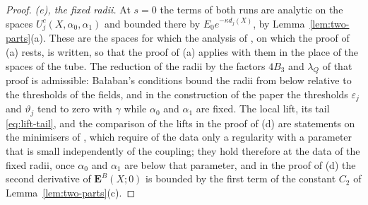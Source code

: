 \documentclass[11pt]{preprint}
\numberwithin{equation}{section}
\theoremstyle{definition}
\theoremstyle{remark}
\theoremstyle{plain}
\begin{document}
\begin{proof}
\emph{(e), the fixed radii.} At $s = 0$ the terms of both runs are analytic on the spaces $U^c_j(X, \alpha_0, \alpha_1)$ and bounded there by $E_0e^{-\kappa d_j(X)}$, by Lemma~\ref{lem:two-parts}(a). These are the spaces for which the analysis of \cite[Sects.~3--4]{BalabanRG1}, on which the proof of (a) rests, is written, so that the proof of (a) applies with them in the place of the spaces of the tube. The reduction of the radii by the factors $4B_3$ and $\lambda_Q$ of that proof is admissible: Ba{\l}aban's conditions bound the radii from below relative to the thresholds of the fields, and in the construction of the paper the thresholds $\varepsilon_j$ and $\vartheta_j$ tend to zero with $\gamma$ while $\alpha_0$ and $\alpha_1$ are fixed. The local lift, its tail \eqref{eq:lift-tail}, and the comparison of the lifts in the proof of (d) are statements on the minimisers of \cite[Theorem~1, p.~279; Proposition~9, p.~309]{BalabanVAR}, which require of the data only a regularity with a parameter that is small independently of the coupling; they hold therefore at the data of the fixed radii, once $\alpha_0$ and $\alpha_1$ are below that parameter, and in the proof of (d) the second derivative of $\mathbf E^B(X; 0)$ is bounded by the first term of the constant $C_2$ of Lemma~\ref{lem:two-parts}(c).


\end{proof}
\end{document}
